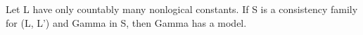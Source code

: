 Let L have only countably many nonlogical constants. If S is a consistency family for (L, L') and Gamma in S, then Gamma has a model.
